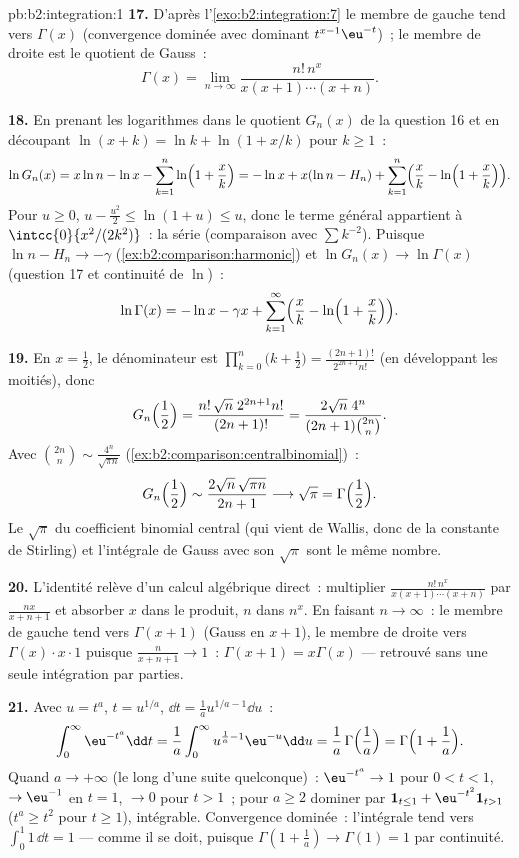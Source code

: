 \begin{solution}{pb:b2:integration:1}
\textbf{17.} D'après l'\cref{exo:b2:integration:7} le membre de gauche tend
vers $\Gamma(x)$ (convergence dominée avec dominant
$t^{x-1}\eu^{-t}$)~; le membre de droite est le quotient de Gauss~:
\[
\Gamma(x) = \lim_{n\to\infty}
\frac{n!\,n^x}{x(x+1)\cdots(x+n)} .
\]

\textbf{18.} En prenant les logarithmes dans le quotient $G_n(x)$
de la question 16 et en découpant $\ln(x+k) = \ln k + \ln(1 + x/k)$ pour $k
\geq 1$~:
\[
\ln G_n(x) = x\ln n - \ln x - \sum_{k=1}^n
\ln\Bigl(1+\frac xk\Bigr)
= -\ln x + x(\ln n - H_n)
+ \sum_{k=1}^n\Bigl(\frac xk -
\ln\Bigl(1+\frac xk\Bigr)\Bigr).
\]
Pour $u \geq 0$, $u - \frac{u^2}2 \leq \ln(1+u) \leq u$, donc le
terme général appartient à $\intcc{0}{x^2/(2k^2)}$~: la série
 (comparaison avec $\sum k^{-2}$). Puisque $\ln n - H_n
\to -\gamma$ (\cref{ex:b2:comparison:harmonic}) et $\ln G_n(x)
\to \ln\Gamma(x)$ (question 17 et continuité de $\ln$)~:
\[
\ln\Gamma(x) = -\ln x - \gamma x
+ \sum_{k=1}^\infty\Bigl(\frac xk -
\ln\Bigl(1+\frac xk\Bigr)\Bigr) .
\]

\textbf{19.} En $x = \frac12$, le dénominateur est
$\prod_{k=0}^n\bigl(k+\frac12\bigr) =
\frac{(2n+1)!}{2^{2n+1}n!}$ (en développant les moitiés), donc
\[
G_n\Bigl(\frac12\Bigr)
= \frac{n!\,\sqrt n\;2^{2n+1}n!}{(2n+1)!}
= \frac{2\sqrt n\;4^n}{(2n+1)\binom{2n}{n}} .
\]
Avec $\binom{2n}{n} \sim \frac{4^n}{\sqrt{\pi n}}$
(\cref{ex:b2:comparison:centralbinomial})~:
\[
G_n\Bigl(\frac12\Bigr)
\sim \frac{2\sqrt n\,\sqrt{\pi n}}{2n+1}
\longrightarrow \sqrt\pi = \Gamma\Bigl(\frac12\Bigr) .
\]
Le $\sqrt\pi$ du coefficient binomial central (qui vient
de Wallis, donc de la constante de Stirling) et l'intégrale
de Gauss avec son $\sqrt\pi$ sont le même nombre.

\textbf{20.} L'identité relève d'un calcul algébrique direct~: multiplier
$\frac{n!\,n^x}{x(x+1)\cdots(x+n)}$ par $\frac{nx}{x+n+1}$ et
absorber $x$ dans le produit, $n$ dans $n^x$. En faisant $n \to
\infty$~: le membre de gauche tend vers $\Gamma(x+1)$ (Gauss en $x+1$),
le membre de droite vers $\Gamma(x)\cdot x\cdot 1$ puisque
$\frac{n}{x+n+1} \to 1$~: $\Gamma(x+1) = x\Gamma(x)$ ---
retrouvé sans une seule intégration par parties.

\textbf{21.} Avec $u = t^a$, $t = u^{1/a}$, $\dd t = \frac1a
u^{1/a - 1}\dd u$~:
\[
\int_0^\infty \eu^{-t^a}\dd t
= \frac1a\int_0^\infty u^{\frac1a - 1}\eu^{-u}\dd u
= \frac1a\,\Gamma\Bigl(\frac1a\Bigr)
= \Gamma\Bigl(1 + \frac1a\Bigr) .
\]
Quand $a \to +\infty$ (le long d'une suite quelconque)~: $\eu^{-t^a} \to 1$ pour
$0 < t < 1$, $\to \eu^{-1}$ en $t = 1$, $\to 0$ pour $t > 1$~;
pour $a \geq 2$ dominer par $\mathbf 1_{t \leq 1} +
\eu^{-t^2}\mathbf 1_{t > 1}$ ($t^a \geq t^2$ pour $t \geq 1$),
intégrable. Convergence dominée~: l'intégrale tend vers
$\int_0^1 1\,\dd t = 1$ --- comme il se doit, puisque $\Gamma(1 +
\frac1a) \to \Gamma(1) = 1$ par continuité.


\end{solution}
